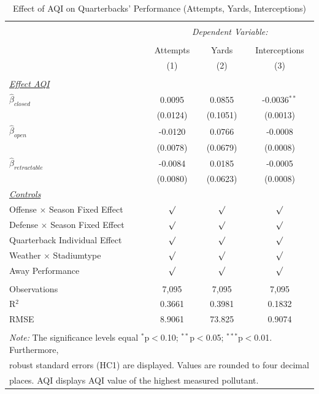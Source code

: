 \documentclass[12pt,a4paper]{article}
\begin{document}
{\begin{table}[!htbp] \centering 
  \caption{Effect of AQI on Quarterbacks' Performance (Attempts, Yards, Interceptions)} 
  \label{A:T3} 
\begin{tabular}{@{\extracolsep{5pt}}lccc} 
\hline \\[-1.8ex] 
& \multicolumn{3}{c}{\textit{Dependent Variable:}} \\ \cline{2-4} \\ [-1.8ex]
& Attempts & Yards & Interceptions \\ 
& (1) & (2) & (3)\\ \hline \\[-1.8ex] 
\underline{\textit{Effect AQI}}\\[0.4cm]
$\hat{\beta}_{closed}$& 0.0095 & 0.0855 & -0.0036$^{**}$ \\ 
& (0.0124)  & (0.1051)& (0.0013) \\[0.4cm]
$\hat{\beta}_{open}$& -0.0120 & 0.0766 & -0.0008\\ 
& (0.0078) & (0.0679) & (0.0008) \\[0.4cm]
$\hat{\beta}_{retractable}$& -0.0084 & 0.0185 & -0.0005 \\ 
& (0.0080) & (0.0623) & (0.0008)\\ [0.4cm]
\underline{\textit{Controls}} \\[0.4cm]
Offense $\times$ Season Fixed Effect & $\surd$ & $\surd$ & $\surd$ \\[0.4cm]
Defense $\times$ Season Fixed Effect & $\surd$ & $\surd$  & $\surd$ \\[0.4cm]
Quarterback Individual Effect & $\surd$ & $\surd$ & $\surd$  \\[0.4cm]
Weather $\times $ Stadiumtype & $\surd$ & $\surd$ & $\surd$ \\[0.4cm]
Away Performance & $\surd$ & $\surd$ & $\surd$\\
\hline \\[-1.8ex] 
Observations & 7,095 & 7,095 & 7,095 \\ 
R$^{2}$ & 0.3661 & 0.3981 & 0.1832 \\ 
RMSE & 8.9061 & 73.825 & 0.9074 \\ \hline 
\hline \\[-1.8ex]  
\multicolumn{4}{l}{\footnotesize \textit{Note:} The significance levels equal {$^{*}$p$<$0.10; $^{**}$p$<$0.05; $^{***}$p$<$0.01}.  Furthermore,} \\ \multicolumn{4}{l}{\footnotesize robust standard errors (HC1) are displayed. Values are rounded to four decimal} \\ \multicolumn{4}{l}{\footnotesize places. AQI displays AQI value of the highest measured pollutant.}

\end{tabular}
\end{table}}
\end{document}
